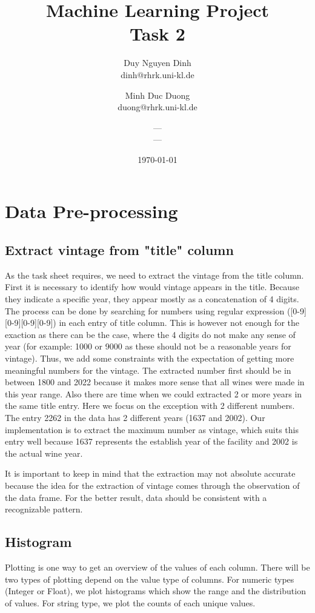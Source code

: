 \documentclass[11pt]{article}
\title{Machine Learning Project\\Task 2}
\author{Duy Nguyen Dinh \\ dinh@rhrk.uni-kl.de\and
	Minh Duc Duong\\ duong@rhrk.uni-kl.de\and
    ---\\ ---}
\date{\today}
\begin{document}
\maketitle

\section{Data Pre-processing}

\subsection{Extract vintage from "title" column}
As the task sheet requires, we need to extract the vintage from the title column. First it is necessary to identify how would vintage appears in the title. Because they indicate a specific year, they appear mostly as a concatenation of 4 digits. The process can be done by searching for numbers using regular expression ([0-9][0-9][0-9][0-9]) in each entry of title column. This is however not enough for the exaction as there can be the case, where the 4 digits do not make any sense of year (for example: 1000 or 9000 as these should not be a reasonable years for vintage). Thus, we add some constraints with the expectation of getting more meaningful numbers for the vintage. The extracted number first should be in between 1800 and 2022 because it makes more sense that all wines were made in this year range. Also there are time when we could extracted 2 or more years in the same title entry. Here we focus on the exception with 2 different numbers. The entry 2262 in the data has 2 different years (1637 and 2002). Our implementation is to extract the maximum number as vintage, which suits this entry well because 1637 represents the establish year of the facility and 2002 is the actual wine year.

It is important to keep in mind that the extraction may not absolute accurate because the idea for the extraction of vintage comes through the observation of the data frame. For the better result, data should be consistent with a recognizable pattern.

\subsection{Histogram}
Plotting is one way to get an overview of the values of each column. There will be two types of plotting depend on the value type of columns. For numeric types (Integer or Float), we plot histograms which show the range and the distribution of values. For string type, we plot the counts of each unique values.
\end{document}
